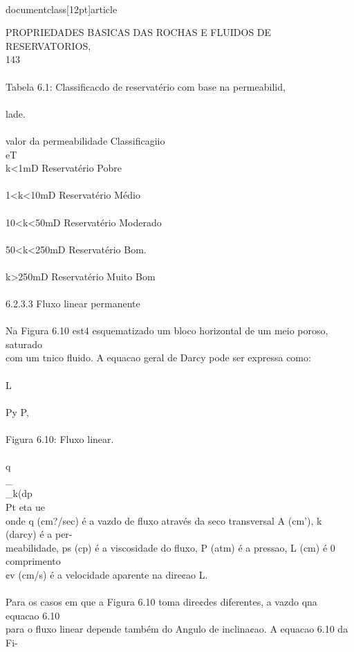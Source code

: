 \\documentclass[12pt]{article}
\begin{document}
PROPRIEDADES BASICAS DAS ROCHAS E FLUIDOS DE RESERVATORIOS,\\
143\\
\\
Tabela 6.1: Classificacdo de reservatério com base na permeabilid,\\
\\
lade.\\
\\
valor da permeabilidade Classificagiio\\
eT\\
k<1mD Reservatério Pobre\\
\\
1<k<10mD Reservatério Médio\\
\\
10<k<50mD Reservatério Moderado\\
\\
50<k<250mD Reservatério Bom.\\
\\
k>250mD Reservatério Muito Bom\\
\\
6.2.3.3 Fluxo linear permanente\\
\\
Na Figura 6.10 est4 esquematizado um bloco horizontal de um meio poroso, saturado\\
com um tnico fluido. A equacao geral de Darcy pode ser expressa como:\\
\\
L\\
\\
Py P,\\
\\
Figura 6.10: Fluxo linear.\\
\\
q\\_\\_k(dp\\
Pt eta ue\\
onde q (cm?/sec) é a vazdo de fluxo através da seco transversal A (cm’), k (darcy) é a per-\\
meabilidade, ps (cp) é a viscosidade do fluxo, P (atm) é a pressao, L (cm) é 0 comprimento\\
¢v (cm/s) é a velocidade aparente na dire¢ao L.\\
\\
Para os casos em que a Figura 6.10 toma dire¢des diferentes, a vazdo qna equacao 6.10\\
para o fluxo linear depende também do Angulo de inclina¢ao. A equacao 6.10 da Fi-\\
\end{document}

